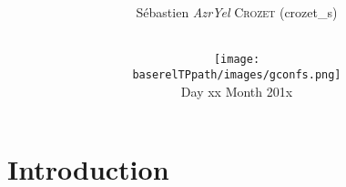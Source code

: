\documentclass[12pt,a4paper]{report}
\begin{document}
\title{
  \vspace{1cm}
  \textbf{\Huge{\Tp{} \workshoptitle}}\\
}
\author{
  \Large{Sébastien \textit{AzrYel} \textsc{Crozet} ({\ttfamily crozet\_s})}\\\\
}

\date{
  \vspace{1cm}
  \texttt{[image: \\baserelTPpath/images/gconfs.png]}\\
  \vspace{0.5cm}
  Day xx Month 201x
}
\maketitle
\newpage
\tableofcontents
\newpage

\section{Introduction}
\end{document}
